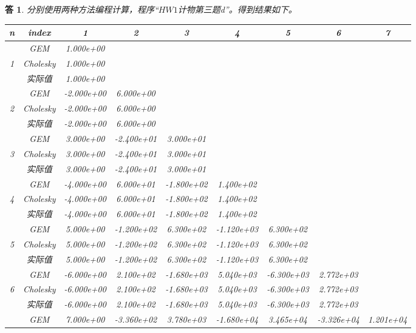 \documentclass[10pt]{ctexart}
\newtheorem*{answer}{答}
\begin{document}
\begin{answer}
    分别使用两种方法编程计算，程序“$HW1$计物第三题d”。得到结果如下。\\
    \begin{table}[H]
        \centering
        \begin{tabular}{ccccccccc}
            \toprule
            n & index & 1 & 2 & 3 & 4 & 5 & 6 & 7\\
            \midrule
             & GEM & 1.000e+00\\
            1 & Cholesky & 1.000e+00\\
             & 实际值 & 1.000e+00\\
            \midrule
             & GEM & -2.000e+00 & 6.000e+00\\
            2 & Cholesky & -2.000e+00 & 6.000e+00\\
             & 实际值 & -2.000e+00 & 6.000e+00\\
            \midrule
            & GEM & 3.000e+00 & -2.400e+01 & 3.000e+01\\
            3 & Cholesky & 3.000e+00 & -2.400e+01 & 3.000e+01\\
             & 实际值 & 3.000e+00 & -2.400e+01 & 3.000e+01\\
            \midrule
            & GEM & -4.000e+00 & 6.000e+01 & -1.800e+02 & 1.400e+02\\
            4 & Cholesky & -4.000e+00 & 6.000e+01 & -1.800e+02 & 1.400e+02\\
             & 实际值 & -4.000e+00 & 6.000e+01 & -1.800e+02 & 1.400e+02\\
            \midrule
            & GEM & 5.000e+00 & -1.200e+02 & 6.300e+02 & -1.120e+03 & 6.300e+02\\
            5 & Cholesky & 5.000e+00 & -1.200e+02 & 6.300e+02 & -1.120e+03 & 6.300e+02\\
             & 实际值 & 5.000e+00 & -1.200e+02 & 6.300e+02 & -1.120e+03 & 6.300e+02\\
            \midrule
            & GEM & -6.000e+00 & 2.100e+02 & -1.680e+03 & 5.040e+03 & -6.300e+03 & 2.772e+03\\
            6 & Cholesky & -6.000e+00 & 2.100e+02 & -1.680e+03 & 5.040e+03 & -6.300e+03 & 2.772e+03\\
             & 实际值 & -6.000e+00 & 2.100e+02 & -1.680e+03 & 5.040e+03 & -6.300e+03 & 2.772e+03\\
            \midrule
            & GEM & 7.000e+00 & -3.360e+02 & 3.780e+03 & -1.680e+04 & 3.465e+04 & -3.326e+04 & 1.201e+04\\

\end{tabular}
\end{table}
\end{answer}
\end{document}
